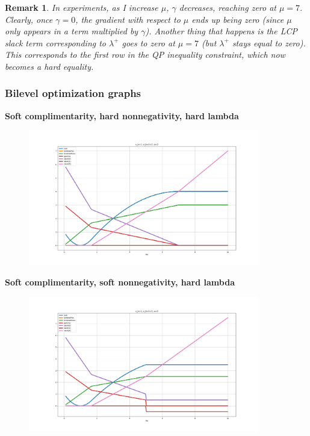 \documentclass{article}
\newtheorem{remark}{Remark}
\begin{document}
\begin{remark}
    In experiments, as I increase $\mu$, $\gamma$ decreases, reaching zero at $\mu = 7$. Clearly, once $\gamma = 0$, the gradient with respect to $\mu$ ends up being zero (since $\mu$ only appears in a term multiplied by $\gamma$). Another thing that happens is the LCP slack term corresponding to $\lambda^+$ goes to zero at $\mu = 7$ (but $\lambda^+$ stays equal to zero). This corresponds to the first row in the QP inequality constraint, which now becomes a hard equality.
\end{remark}

\subsubsection{Bilevel optimization graphs}
\textbf{Soft complimentarity, hard nonnegativity, hard lambda}
\begin{figure}[H]
    \includegraphics[width=0.9\textwidth]{experiment1}
\end{figure}

\textbf{Soft complimentarity, soft nonnegativity, hard lambda}
\begin{figure}[H]
    \includegraphics[width=0.9\textwidth]{experiment2}
\end{figure}
\end{document}
